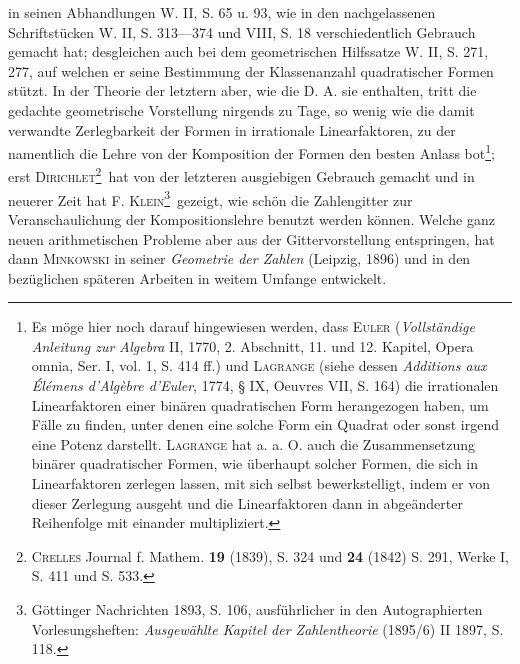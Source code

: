 \noindent in seinen Abhandlungen W. II, S. 65 u. 93, wie in den nachgelassenen Schriftstücken W. II, S. 313—374 und VIII, S. 18 verschiedentlich Gebrauch gemacht hat; desgleichen auch bei dem geometrischen Hilfssatze W. II, S. 271, 277, auf welchen er seine Bestimmung der Klassenanzahl quadratischer Formen stützt. In der Theorie der letztern aber, wie die D. A. sie enthalten, tritt die gedachte geometrische Vorstellung nirgends zu Tage, so wenig wie die damit verwandte Zerlegbarkeit der Formen in irrationale Linearfaktoren, zu der namentlich die Lehre von der Komposition der Formen den besten Anlass bot\footnote{Es möge hier noch darauf hingewiesen werden, dass \textsc{Euler} (\textit{Vollständige Anleitung zur Algebra} II, 1770, 2. Abschnitt, 11. und 12. Kapitel, Opera omnia, Ser. I, vol. 1, S. 414 ff.) und \textsc{Lagrange} (siehe dessen \textit{Additions aux Élémens d’Algèbre d’Euler}, 1774, § IX, Oeuvres VII, S. 164) die irrationalen Linearfaktoren einer binären quadratischen Form herangezogen haben, um Fälle zu finden, unter denen eine solche Form ein Quadrat oder sonst irgend eine Potenz darstellt. \textsc{Lagrange} hat a. a. O. auch die Zusammensetzung binärer quadratischer Formen, wie überhaupt solcher Formen, die sich in Linearfaktoren zerlegen lassen, mit sich selbst bewerkstelligt, indem er von dieser Zerlegung ausgeht und die Linearfaktoren dann in abgeänderter Reihenfolge mit einander multipliziert.}; erst \textsc{Dirichlet}\begingroup\renewcommand{\thefootnote}{**)}\footnote{\textsc{Crelles} Journal f. Mathem. \textbf{19} (1839), S. 324 und \textbf{24} (1842) S. 291, Werke I, S. 411 und S. 533.}\endgroup\ hat von der letzteren ausgiebigen Gebrauch gemacht und in neuerer Zeit hat F. \textsc{Klein}\begingroup\renewcommand{\thefootnote}{***)}\footnote{Göttinger Nachrichten 1893, S. 106, ausführlicher in den Autographierten Vorlesungsheften: \textit{Ausgewählte Kapitel der Zahlentheorie} (1895/6) II 1897, S. 118.}\endgroup\ gezeigt, wie schön die Zahlengitter zur Veranschaulichung der Kompositionslehre benutzt werden können. Welche ganz neuen arithmetischen Probleme aber aus der Gittervorstellung entspringen, hat dann \textsc{Minkowski} in seiner \textit{Geometrie der Zahlen} (Leipzig, 1896) und in den bezüglichen späteren Arbeiten in weitem Umfange entwickelt.
